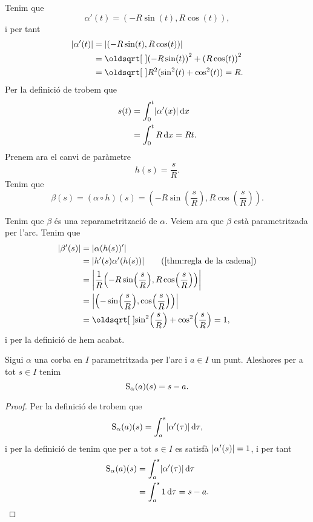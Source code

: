 \documentclass[../Apunts.tex]{subfiles}
\begin{document}
	\begin{solution}
		Tenim que
		\[\alpha'(t)=(-R\sin(t),R\cos(t)),\]
		i per tant
		\begin{align*}
			\norm{\alpha'(t)}&=\norm{(-R\sin(t),R\cos(t))} \\
			&=\sqrt{{(-R\sin(t))}^{2}+{(R\cos(t))}^{2}} \\
			&=\sqrt{R^{2}(\sin^{2}(t)+\cos^{2}(t))}=R.
		\end{align*}
		Per la definició de  trobem que
		\begin{align*}
			s(t)&=\int_{0}^{t}\norm{\alpha'(x)}\diff x \\
			&=\int_{0}^{t}R\diff x=Rt.
		\end{align*}
		Prenem ara el canvi de paràmetre
		\[h(s)=\frac{s}{R}.\]
		Tenim que
		\[\beta(s)=(\alpha\circ h)(s)=\left(-R\sin\left(\frac{s}{R}\right),R\cos\left(\frac{s}{R}\right)\right).\]
		
		Tenim que \(\beta\) és una reparametrització de \(\alpha\). Veiem ara que \(\beta\) està parametritzada per l'arc. Tenim que
		\begin{align*}
			\norm{\beta'(s)}&=\norm{\alpha(h(s))'} \\
			&=\norm{h'(s)\alpha'(h(s))} \tag{\ref{thm:regla de la cadena}}\\
			&=\norm{\frac{1}{R}\left(-R\sin\left(\frac{s}{R}\right),R\cos\left(\frac{s}{R}\right)\right)} \\
			&=\norm{\left(-\sin\left(\frac{s}{R}\right),\cos\left(\frac{s}{R}\right)\right)} \\
			&=\sqrt{\sin^{2}\left(\frac{s}{R}\right)+\cos^{2}\left(\frac{s}{R}\right)}=1,
		\end{align*}
		i per la definició de  hem acabat.
	\end{solution}
	\begin{observation}
		Sigui \(\alpha\) una corba en \(I\) parametritzada per l'arc i \(a\in I\) un punt. Aleshores per a tot \(s\in I\) tenim
		\[\operatorname{S}_{\alpha}(a)(s)=s-a.\]
	\end{observation}
	\begin{proof}
		Per la definició de  trobem que
		\[\funciolongituddarc_{\alpha}(a)(s)=\int_{a}^{s}\norm{\alpha'(\tau)}\diff\tau,\]
		i per la definició de  tenim que  per a tot \(s\in I\) es satisfà \(\norm{\alpha'(s)}=1\), i per tant
		\begin{align*}
			\funciolongituddarc_{\alpha}(a)(s)&=\int_{a}^{s}\norm{\alpha'(\tau)}\diff\tau \\
			&=\int_{a}^{s}1\diff\tau=s-a.\qedhere
		\end{align*}
	\end{proof}
\end{document}
